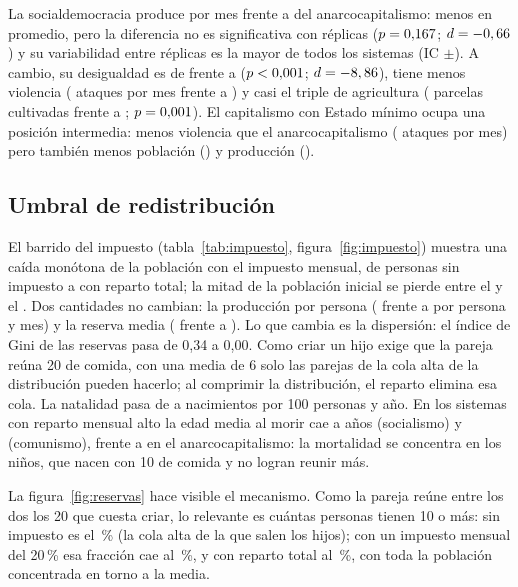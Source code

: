 \documentclass[11pt,a4paper]{article}
\begin{document}
La socialdemocracia produce \prodSocdem{} por mes frente a \prodAncap{} del anarcocapitalismo: menos en promedio, pero la diferencia no es significativa con \nReplicas{} réplicas ($p=0{,}167$; $d=-0,66$) y su variabilidad entre réplicas es la mayor de todos los sistemas (IC $\pm$\prodSocdemIC). A cambio, su desigualdad es de \giniSocdem{} frente a \giniAncap{} ($p<0{,}001$; $d=-8,86$), tiene menos violencia (\ataqSocdem{} ataques por mes frente a \ataqAncap) y casi el triple de agricultura (\cultivosSocdem{} parcelas cultivadas frente a \cultivosAncap{}; $p=0{,}001$). El capitalismo con Estado mínimo ocupa una posición intermedia: menos violencia que el anarcocapitalismo (\ataqMinimo{} ataques por mes) pero también menos población (\pobMinimo) y producción (\prodMinimo).

\subsection{Umbral de redistribución}
El barrido del impuesto (tabla~\ref{tab:impuesto}, figura~\ref{fig:impuesto}) muestra una caída monótona de la población con el impuesto mensual, de \pobImpCero{} personas sin impuesto a \pobImpUno{} con reparto total; la mitad de la población inicial se pierde entre el \umbralImpuestoPrevio{} y el \umbralImpuesto{}. Dos cantidades no cambian: la producción por persona (\prodPcImpCero{} frente a \prodPcImpUno{} por persona y mes) y la reserva media (\reservaImpCero{} frente a \reservaImpUno). Lo que cambia es la dispersión: el índice de Gini de las reservas pasa de 0{,}34 a 0{,}00. Como criar un hijo exige que la pareja reúna 20 de comida, con una media de 6 solo las parejas de la cola alta de la distribución pueden hacerlo; al comprimir la distribución, el reparto elimina esa cola. La natalidad pasa de \natImpCero{} a \natImpUno{} nacimientos por 100 personas y año. En los sistemas con reparto mensual alto la edad media al morir cae a \esperanzaSocial{} años (socialismo) y \esperanzaComun{} (comunismo), frente a \esperanzaAncap{} en el anarcocapitalismo: la mortalidad se concentra en los niños, que nacen con 10 de comida y no logran reunir más.

La figura~\ref{fig:reservas} hace visible el mecanismo. Como la pareja reúne entre los dos los 20 que cuesta criar, lo relevante es cuántas personas tienen 10 o más: sin impuesto es el \pctSobreDiezCero{}\,\% (la cola alta de la que salen los hijos); con un impuesto mensual del 20\,\% esa fracción cae al \pctSobreDiezVeinte{}\,\%, y con reparto total al \pctSobreDiezTotal{}\,\%, con toda la población concentrada en torno a la media.
\end{document}

